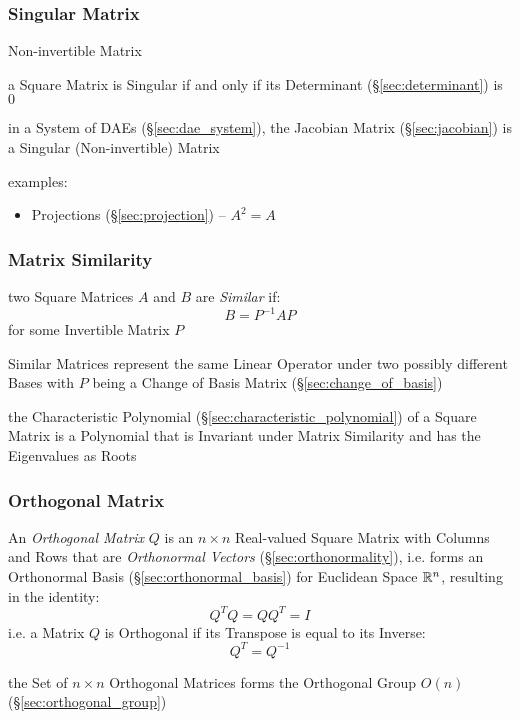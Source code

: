 \subsubsection{Singular Matrix}\label{sec:singular_matrix}

Non-invertible Matrix

a Square Matrix is Singular if and only if its Determinant
(\S\ref{sec:determinant}) is $0$

\fist in a System of DAEs (\S\ref{sec:dae_system}), the Jacobian Matrix
(\S\ref{sec:jacobian}) is a Singular (Non-invertible) Matrix

examples:
\begin{itemize}
  \item Projections (\S\ref{sec:projection}) -- $A^2 = A$
\end{itemize}



\subsubsection{Matrix Similarity}\label{sec:matrix_similarity}

two Square Matrices $A$ and $B$ are \emph{Similar} if:
\[
  B = P^{-1}AP
\]
for some Invertible Matrix $P$

Similar Matrices represent the same Linear Operator under two possibly
different Bases with $P$ being a Change of Basis Matrix
(\S\ref{sec:change_of_basis})

the Characteristic Polynomial (\S\ref{sec:characteristic_polynomial}) of a
Square Matrix is a Polynomial that is Invariant under Matrix Similarity and has
the Eigenvalues as Roots



\subsubsection{Orthogonal Matrix}\label{sec:orthogonal_matrix}

An \emph{Orthogonal Matrix} $Q$ is an $n \times n $ Real-valued Square Matrix
with Columns and Rows that are \emph{Orthonormal Vectors}
(\S\ref{sec:orthonormality}), i.e. forms an Orthonormal Basis
(\S\ref{sec:orthonormal_basis}) for Euclidean Space $\mathbb{R}^n$, resulting in
the identity:
\[
  Q^TQ = QQ^T = I
\]
i.e. a Matrix $Q$ is Orthogonal if its Transpose is equal to its Inverse:
\[
  Q^T = Q^{-1}
\]

the Set of $n \times n$ Orthogonal Matrices forms the Orthogonal Group
$O(n)$ (\S\ref{sec:orthogonal_group})

